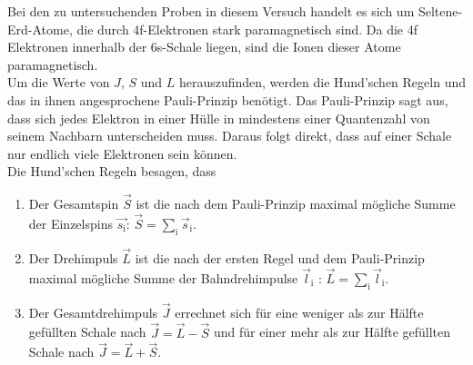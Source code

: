 Bei den zu untersuchenden Proben in diesem Versuch handelt es sich um Seltene-Erd-Atome, die durch 4f-Elektronen stark paramagnetisch sind.
Da die 4f Elektronen innerhalb der 6s-Schale liegen, sind die Ionen dieser Atome paramagnetisch.\\
Um die Werte von $J$, $S$ und $L$ herauszufinden, werden die Hund'schen Regeln und das in ihnen angesprochene Pauli-Prinzip benötigt.
Das Pauli-Prinzip sagt aus, dass sich jedes Elektron in einer Hülle in mindestens einer Quantenzahl von seinem Nachbarn unterscheiden muss.
Daraus folgt direkt, dass auf einer Schale nur endlich viele Elektronen sein können.\\
Die Hund'schen Regeln besagen, dass
\begin{enumerate}
    \item Der Gesamtspin $\vec{S}$ ist die nach dem Pauli-Prinzip maximal mögliche Summe der Einzelspins $\vec{s_{\text{i}}}$: $\vec{S} = \sum_{\text{i}} \vec{s}_{\text{i}}$.
    \item Der Drehimpuls $\vec{L}$ ist die nach der ersten Regel und dem Pauli-Prinzip maximal mögliche Summe der Bahndrehimpulse $\vec{l}_{\text{i}}$ : $\vec{L} = \sum_{\text{i}} \vec{l}_{\text{i}}$.
    \item Der Gesamtdrehimpuls $\vec{J}$ errechnet sich für eine weniger als zur Hälfte gefüllten Schale nach $\vec{J} = \vec{L} - \vec{S}$ und für einer mehr als zur Hälfte gefüllten Schale nach $\vec{J} = \vec{L} + \vec{S}$.
\end{enumerate}

